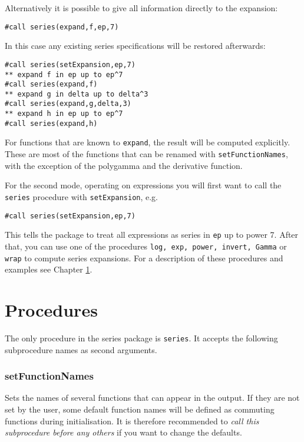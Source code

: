 \documentclass[titlepage]{article}
\begin{document}
Alternatively it is possible to give all information
directly to the expansion:
\begin{lstlisting}
#call series(expand,f,ep,7)
\end{lstlisting}
In this case any existing series specifications will be restored
afterwards:
\begin{lstlisting}
#call series(setExpansion,ep,7)
** expand f in ep up to ep^7
#call series(expand,f)
** expand g in delta up to delta^3
#call series(expand,g,delta,3)
** expand h in ep up to ep^7
#call series(expand,h)
\end{lstlisting}

For functions that are known to \lstinline!expand!, the result will
be computed explicitly. These are most of the functions that can be
renamed with \lstinline!setFunctionNames!, with the exception of the
polygamma and the derivative function.

For the second mode, operating on expressions you will first want to
call the \lstinline!series! procedure with \lstinline!setExpansion!, e.g.
\begin{lstlisting}
#call series(setExpansion,ep,7)
\end{lstlisting}
This tells the package to treat all expressions as series in \texttt{ep} up
to power 7. After that, you can use one of the procedures \lstinline!log, exp, power, invert, Gamma! or \lstinline!wrap! to compute series expansions. For a
description of these procedures and examples see Chapter \ref{sec:proc}.

\section{Procedures}
\label{sec:proc}

The only procedure in the series package is \lstinline!series!. It
accepts the following subprocedure names as second arguments.

\subsubsection{setFunctionNames}
\label{sec:setFunctionNames}

Sets the names of several functions that can appear in the output. If
they are not set by the user, some default function names will be
defined as commuting functions during initialisation. It is therefore
recommended to \emph{call this subprocedure before any others} if you
want to change the defaults.
\end{document}
